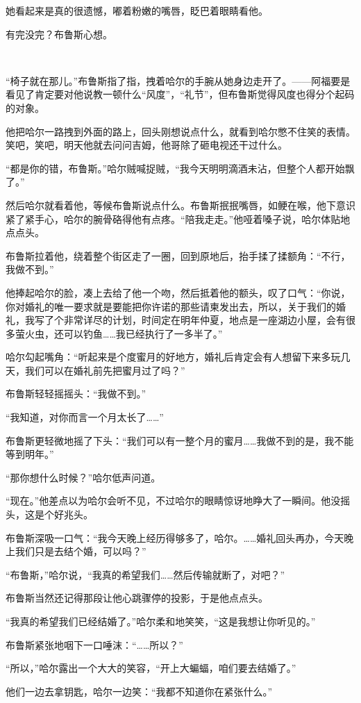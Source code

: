 \documentclass[../main]{subfiles}
\begin{document}
她看起来是真的很遗憾，嘟着粉嫩的嘴唇，眨巴着眼睛看他。

有完没完？布鲁斯心想。

~\

“椅子就在那儿。”布鲁斯指了指，拽着哈尔的手腕从她身边走开了。——阿福要是看见了肯定要对他说教一顿什么“风度”，“礼节”，但布鲁斯觉得风度也得分个起码的对象。

他把哈尔一路拽到外面的路上，回头刚想说点什么，就看到哈尔憋不住笑的表情。笑吧，笑吧，明天他就去问问吉姆，他哥除了砸电视还干过什么。

“都是你的错，布鲁斯。”哈尔贼喊捉贼，“我今天明明滴酒未沾，但整个人都开始飘了。”

然后哈尔就看着他，等候布鲁斯说点什么。布鲁斯抿抿嘴唇，如鲠在喉，他下意识紧了紧手心，哈尔的腕骨硌得他有点疼。“陪我走走。”他哑着嗓子说，哈尔体贴地点点头。

布鲁斯拉着他，绕着整个街区走了一圈，回到原地后，抬手揉了揉额角：“不行，我做不到。”

他捧起哈尔的脸，凑上去给了他一个吻，然后抵着他的额头，叹了口气：“你说，你对婚礼的唯一要求就是要能把你许诺的那些请柬发出去，所以，关于我们的婚礼，我写了个非常详尽的计划，时间定在明年仲夏，地点是一座湖边小屋，会有很多萤火虫，还可以钓鱼……我已经执行了一多半了。”

哈尔勾起嘴角：“听起来是个度蜜月的好地方，婚礼后肯定会有人想留下来多玩几天，我们可以在婚礼前先把蜜月过了吗？”

布鲁斯轻轻摇摇头：“我做不到。”

“我知道，对你而言一个月太长了……”

布鲁斯更轻微地摇了下头：“我们可以有一整个月的蜜月……我做不到的是，我不能等到明年。”

“那你想什么时候？”哈尔低声问道。

“现在。”他差点以为哈尔会听不见，不过哈尔的眼睛惊讶地睁大了一瞬间。他没摇头，这是个好兆头。

布鲁斯深吸一口气：“我今天晚上经历得够多了，哈尔。……婚礼回头再办，今天晚上我们只是去结个婚，可以吗？”

“布鲁斯，”哈尔说，“我真的希望我们……然后传输就断了，对吧？”

布鲁斯当然还记得那段让他心跳骤停的投影，于是他点点头。

“我真的希望我们已经结婚了。”哈尔柔和地笑笑，“这是我想让你听见的。”

布鲁斯紧张地咽下一口唾沫：“……所以？”

“所以，”哈尔露出一个大大的笑容，“开上大蝙蝠，咱们要去结婚了。”

他们一边去拿钥匙，哈尔一边笑：“我都不知道你在紧张什么。”
\end{document}
